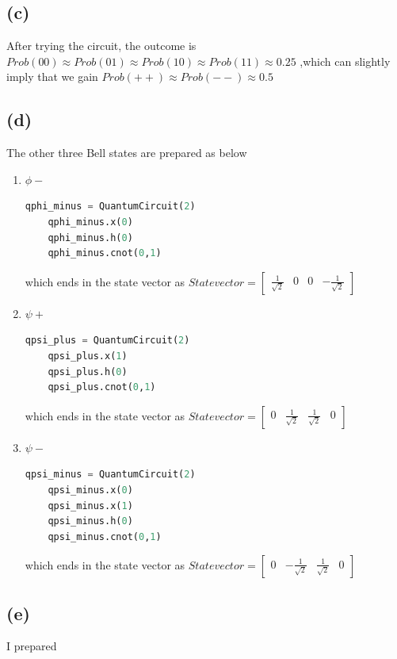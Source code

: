 \documentclass{article}
\begin{document}
\begin{CJK*}{UTF8}{bsmi}
\subsection{(c)}
After trying the circuit, the outcome is $Prob(00) \approx Prob(01) \approx Prob(10) \approx Prob(11) \approx 0.25$ ,which can slightly imply that we gain $Prob(++) \approx Prob(--)  \approx 0.5$

\subsection{(d)}
The other three Bell states are prepared as below
\begin{enumerate}
    \item $\phi-$ 
    \begin{lstlisting}[language=Python]
    qphi_minus = QuantumCircuit(2)
    qphi_minus.x(0)
    qphi_minus.h(0)
    qphi_minus.cnot(0,1)
    \end{lstlisting}
    which ends in the state vector as 
    $Statevector =\begin{bmatrix}
    \frac{1}{\sqrt{2}} & 0 & 0 & - \frac{1}{\sqrt{2}}
    \end{bmatrix} $
    \item $\psi+$  
    \begin{lstlisting}[language=Python]
    qpsi_plus = QuantumCircuit(2)
    qpsi_plus.x(1)
    qpsi_plus.h(0)
    qpsi_plus.cnot(0,1)
    \end{lstlisting}
    which ends in the state vector as 
    $Statevector =\begin{bmatrix}
    0 & \frac{1}{\sqrt{2}} & \frac{1}{\sqrt{2}} & 0
    \end{bmatrix} $
    \item $\psi-$ 
    \begin{lstlisting}[language=Python]
    qpsi_minus = QuantumCircuit(2)
    qpsi_minus.x(0)
    qpsi_minus.x(1) 
    qpsi_minus.h(0)
    qpsi_minus.cnot(0,1)
    \end{lstlisting}
    which ends in the state vector as 
    $Statevector =\begin{bmatrix}
    0 & -\frac{1}{\sqrt{2}} & \frac{1}{\sqrt{2}} & 0
    \end{bmatrix} $
    
\end{enumerate}
\subsection{(e)}
I prepared


\end{CJK*}
\end{document}
